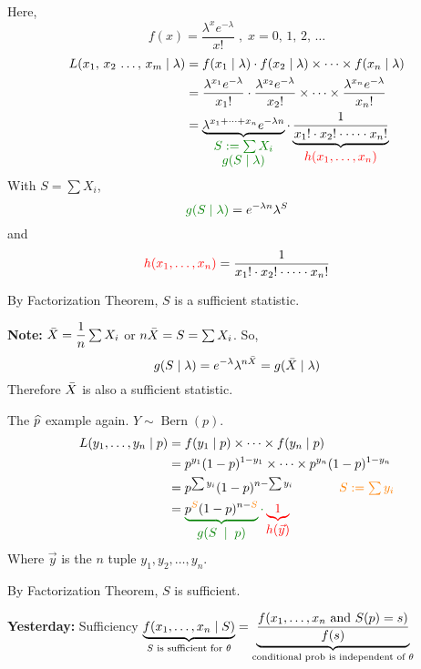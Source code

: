 \nl Here,
$$f(x) = \frac{\lambda^x e^{-\lambda}}{x!}\;,\; x = 0,\, 1,\, 2,\,\dots$$
\begin{align}
L(x_1,\, x_2\, \dots,\,x_m \mid \lambda) &= 
f(x_1 \mid \lambda)\cdot f(x_2 \mid \lambda)\times \cdots \times f(x_n \mid \lambda) \notag\\
&= \frac{\lambda^{x_1} e^{-\lambda}}{x_1!} \cdot \frac{\lambda^{x_2} e^{-\lambda}}{x_2!}\times \cdots \times \frac{\lambda^{x_n} e^{-\lambda}}{x_n!}\notag\\
&= \underbrace{\lambda^{x_1 + \cdots + x_n}e^{-\lambda n}}_{\substack{\color{ggreen}\textstyle S := \sum X_i\\ \color{ggreen}\textstyle g(S \mid \lambda) }} \cdot \underbrace{\frac{1}{x_1! \cdot x_2! \cdot \cdots \cdot x_n!}}_{\color{red}\textstyle h(\thru{x})}\notag
\end{align}
With $S=\sum X_i$,
$$\color{ggreen}g(S \mid \lambda)\color{black} = e^{-\lambda n}\lambda^S$$
and
$$\color{red}h(\thru{x})\color{black} = \over{x_1! \cdot x_2! \cdot \cdots \cdot x_n!}$$

\noindent \color{orange} By Factorization Theorem, $S$ is a sufficient statistic.\color{black}

\nnl \textbf{Note:} $\bar{X} = \dfrac{1}{n} \sum X_i$ or $n\bar{X} = S = \sum X_i$. So,
$$g(S \mid \lambda) = e^{-\lambda}\lambda^{n\bar{X}} = g(\bar{X} \mid \lambda)$$
Therefore $\bar{X}$ is also a sufficient statistic.

\example The $\widehat{p}$ example again. $Y\sim \operatorname{Bern}(p)$.
\begin{align}
    L(\thru{y} \mid p) &= f(y_1 \mid p) \times \cdots \times f(y_n \mid p)     \notag\\
    &= p^{y_1}(1-p)^{1-y_1}\times \cdots \times p^{y_n}(1-p)^{1-y_n} \notag\\
    &= p^{\sum y_i}(1-p)^{n-\sum y_i} \hspace{0.5in} \color{orange}\textstyle S := \sum y_i\color{black} \notag\\
    &= \color{ggreen}\underbrace{\color{black} p^{\color{orange}S}(1-p)^{n-\color{orange}S}}_{\textstyle g(S \;\mid\; p)}\cdot \color{red} \underbrace{1}_{\textstyle h(\vec{y})} \notag
\end{align}
Where $\vec{y}$ is the $n$ tuple $y_1, y_2, \dots, y_n$.

\nl By Factorization Theorem, $S$ is sufficient.

\nnl \textbf{Yesterday:} Sufficiency
$\underbrace{f({x}_1, \dots, {x}_n\mid S)}_{S \text{ is sufficient for }\theta} = \underbrace{\frac{f({x}_1, \dots, {x}_n \text{ and } S(p) = s)}{f(s)}}_{\text{conditional prob is independent of } \theta}$


